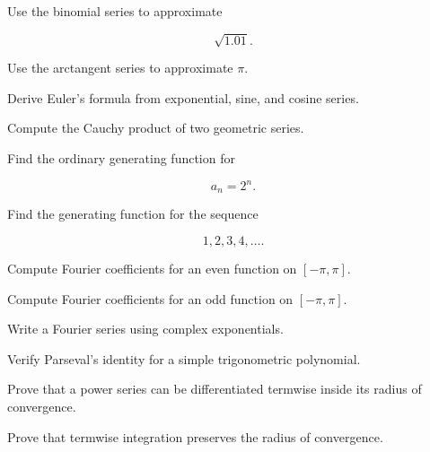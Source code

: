 \begin{exercise}[3]
Use the binomial series to approximate

\[
\sqrt{1.01}.
\]
\end{exercise}

\begin{exercise}[3]
Use the arctangent series to approximate \(\pi\).
\end{exercise}

\begin{exercise}[3]
Derive Euler's formula from exponential, sine, and cosine series.
\end{exercise}

\begin{exercise}[3]
Compute the Cauchy product of two geometric series.
\end{exercise}

\begin{exercise}[3]
Find the ordinary generating function for

\[
a_n=2^n.
\]
\end{exercise}

\begin{exercise}[3]
Find the generating function for the sequence

\[
1,2,3,4,\ldots.
\]
\end{exercise}

\begin{exercise}[3]
Compute Fourier coefficients for an even function on \([-\pi,\pi]\).
\end{exercise}

\begin{exercise}[3]
Compute Fourier coefficients for an odd function on \([-\pi,\pi]\).
\end{exercise}

\begin{exercise}[3]
Write a Fourier series using complex exponentials.
\end{exercise}

\begin{exercise}[3]
Verify Parseval's identity for a simple trigonometric polynomial.
\end{exercise}

\begin{exercise}[4]
Prove that a power series can be differentiated termwise inside its radius of
convergence.
\end{exercise}

\begin{exercise}[4]
Prove that termwise integration preserves the radius of convergence.
\end{exercise}

